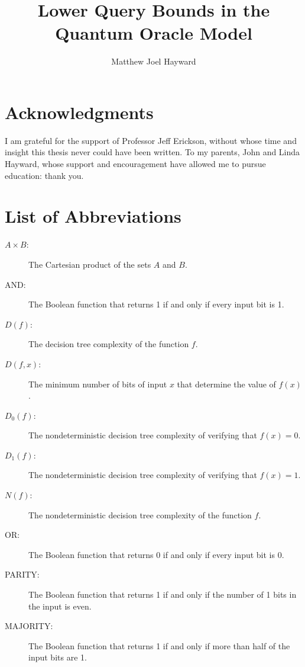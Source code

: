 \documentclass[12pt,oneside]{book}
\begin{document}
\title{Lower Query Bounds in the Quantum Oracle Model}
\author{Matthew Joel Hayward}
\msthesis
{}
\maketitle

\frontmatter


\chapter*{Acknowledgments}

I am grateful for the support of Professor Jeff Erickson, without
whose time and insight this thesis never could have been written.  To
my parents, John and Linda Hayward, whose support and encouragement
have allowed me to pursue education: thank you.


\tableofcontents
\listoftables
\listoffigures


\chapter*{List of Abbreviations}
\begin{description}
\item[$A \times B$:] The Cartesian product of the sets $A$ and $B$.
\item[AND:] The Boolean function that returns 1 if and only if every input bit is 1.
\item[$D(f)$:] The decision tree complexity of the function $f$.
\item[$D(f,x)$:] The minimum number of bits of input $x$ that determine the value of $f(x)$.
\item[$D_{0}(f)$:] The nondeterministic decision tree complexity 
of verifying that $f(x) = 0$.
\item[$D_{1}(f)$:] The nondeterministic decision tree complexity 
of verifying that $f(x) = 1$.
\item[$N(f)$:] The nondeterministic decision tree complexity of the function $f$.
\item[OR:] The Boolean function that returns 0 if and only if every input bit is 0.
\item[PARITY:] The Boolean function that returns 1 if and only if the number of 1 bits in the input is even.
\item[MAJORITY:] The Boolean function that returns 1 if and only if more than half of the input bits are 1.


\end{description}
\end{document}
